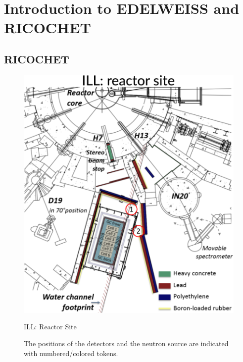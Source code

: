 
\chapter{Introduction to EDELWEISS and RICOCHET} %

\label{ChapterIntroduction} %



\section{RICOCHET}

\begin{figure}
\centering
  \includegraphics[scale=1]{Figures/Introduction/scheme_ill.png}
  \caption{ILL: Reactor Site}
  \label{fig:scheme-ill}
\caption{The positions of the detectors and the neutron source are indicated with numbered/colored tokens.}
\label{fig:scheme-site}
\end{figure}
